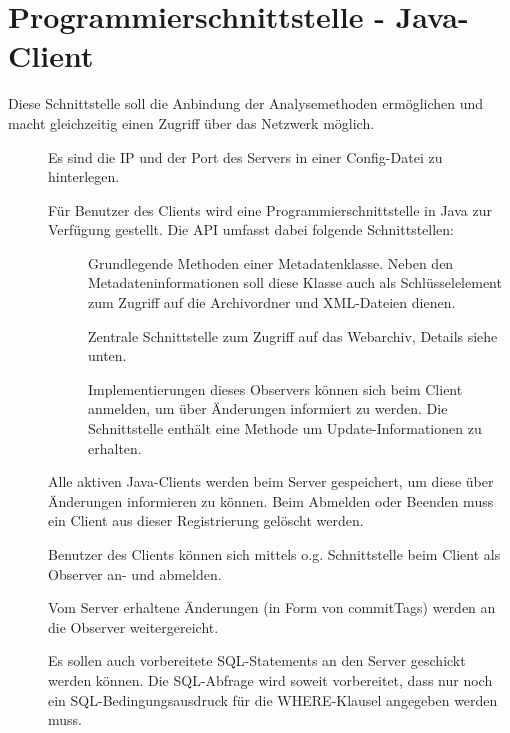 \section{Programmierschnittstelle - Java-Client}\label{spec:client}
	Diese Schnittstelle soll die Anbindung der Analysemethoden ermöglichen und 
	macht gleichzeitig einen Zugriff über das Netzwerk möglich.
\begin{description}
	\item []
		Es sind die IP und der Port des Servers in einer Config-Datei zu hinterlegen.
	\item []
		Für Benutzer des Clients wird eine Programmierschnittstelle in Java zur Verfügung gestellt.
		Die API umfasst dabei folgende Schnittstellen:
		\begin{description}
			\item []
				Grundlegende Methoden einer Metadatenklasse.
				Neben den Metadateninformationen soll diese Klasse auch als
				Schlüsselelement zum Zugriff auf die Archivordner und XML-Dateien dienen.
			\item []
				Zentrale Schnittstelle zum Zugriff auf das Webarchiv, Details siehe unten.
			\item []
				Implementierungen dieses Observers können sich beim Client anmelden, 
				um über Änderungen informiert zu werden. 
				Die Schnittstelle enthält eine Methode um Update-Informationen zu erhalten.
		\end{description}
	\item []
		Alle aktiven Java-Clients werden beim Server gespeichert, 
		um diese über Änderungen informieren zu können.
		Beim Abmelden oder Beenden muss ein Client aus dieser Registrierung gelöscht werden.
	\item []
		Benutzer des Clients können sich mittels o.g. Schnittstelle beim Client als Observer an- und abmelden.
	\item []
		Vom Server erhaltene Änderungen (in Form von commitTags) werden an die Observer weitergereicht.
	\item []
		Es sollen auch vorbereitete SQL-Statements an den Server geschickt werden können. 
		Die SQL-Abfrage wird soweit vorbereitet, 
		dass nur noch ein SQL-Bedingungsausdruck für die WHERE-Klausel angegeben werden muss.

\end{description}
